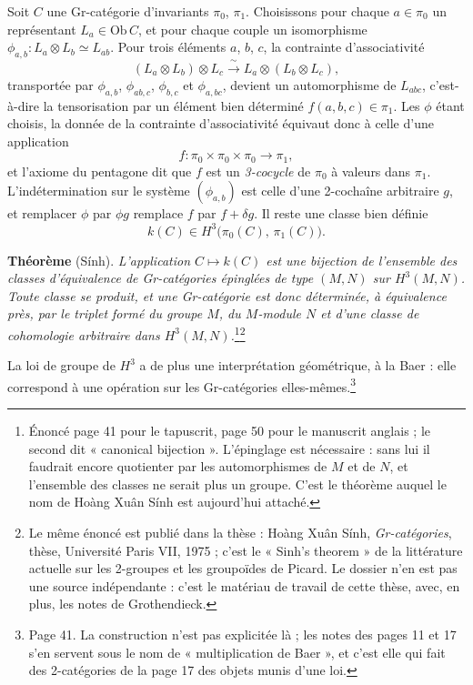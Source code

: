 \documentclass[11pt,a4paper]{article}
\begin{document}
Soit $C$ une Gr-catégorie d'invariants $\pi_{0}$, $\pi_{1}$. Choisissons pour
chaque $a \in \pi_{0}$ un représentant $L_{a} \in \mathrm{Ob}\,C$, et pour
chaque couple un isomorphisme $\phi_{a,b} : L_{a} \otimes L_{b} \simeq
L_{ab}$. Pour trois éléments $a$, $b$, $c$, la contrainte d'associativité
\[
(L_{a} \otimes L_{b}) \otimes L_{c} \xrightarrow{\ \sim\ }
L_{a} \otimes (L_{b} \otimes L_{c}),
\]
transportée par $\phi_{a,b}$, $\phi_{ab,c}$, $\phi_{b,c}$ et $\phi_{a,bc}$,
devient un automorphisme de $L_{abc}$, c'est-à-dire la tensorisation par un
élément bien déterminé $f(a,b,c) \in \pi_{1}$. Les $\phi$ étant choisis, la
donnée de la contrainte d'associativité équivaut donc à celle d'une
application
\[
f : \pi_{0} \times \pi_{0} \times \pi_{0} \longrightarrow \pi_{1},
\]
et l'axiome du pentagone dit que $f$ est un \emph{3-cocycle} de
$\pi_{0}$ à valeurs dans $\pi_{1}$. L'indétermination sur le système
$(\phi_{a,b})$ est celle d'une 2-cochaîne arbitraire $g$, et remplacer $\phi$
par $\phi g$ remplace $f$ par $f + \delta g$. Il reste une classe bien
définie
\[
k(C) \in H^{3}\bigl(\pi_{0}(C),\, \pi_{1}(C)\bigr).
\]

\textbf{Théorème} (Sính). \emph{L'application $C \mapsto k(C)$ est une
bijection de l'ensemble des classes d'équivalence de Gr-catégories épinglées
de type $(M,N)$ sur $H^{3}(M,N)$. Toute classe se produit, et une
Gr-catégorie est donc déterminée, à équivalence près, par le triplet formé du
groupe $M$, du $M$-module $N$ et d'une classe de cohomologie arbitraire dans
$H^{3}(M,N)$.}\footnote{Énoncé page 41 pour le tapuscrit, page 50 pour le
manuscrit anglais ; le second dit « canonical bijection ». L'épinglage est
nécessaire : sans lui il faudrait encore quotienter par les
automorphismes de $M$ et de $N$, et l'ensemble des classes ne serait plus un
groupe. C'est le théorème auquel le nom de Hoàng Xuân Sính est aujourd'hui
attaché.}\footnote{Le même énoncé est publié dans la thèse : Hoàng Xuân Sính,
\emph{Gr-catégories}, thèse, Université Paris VII, 1975 ; c'est le « Sinh’s
theorem » de la littérature actuelle sur les 2-groupes et les groupoïdes de
Picard. Le dossier n'en est pas une source indépendante : c'est le matériau de
travail de cette thèse, avec, en plus, les notes de Grothendieck.}

La loi de groupe de $H^{3}$ a de plus une interprétation géométrique, à la
Baer : elle correspond à une opération sur les Gr-catégories
elles-mêmes.\footnote{Page 41. La construction n'est pas explicitée là ; les
notes des pages 11 et 17 s'en servent sous le nom de « multiplication de
Baer », et c'est elle qui fait des 2-catégories de la page 17 des objets
munis d'une loi.}
\end{document}
